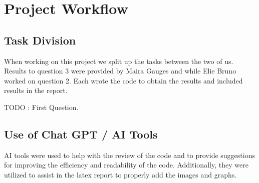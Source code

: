 
\section{Project Workflow}
\subsection{Task Division}

When working on this project we split up the tasks between the two of us. Results to question 3 were provided by Maira Gauges and while Elie Bruno worked on question 2. Each wrote the code to obtain the results and included results in the report. 

TODO : First Question.

\subsection{Use of Chat GPT / AI Tools}
AI tools were used to help with the review of the code and to provide suggestions for improving the efficiency and readability of the code. Additionally, they were utilized to assist in the latex report to properly add the images and graphs.




